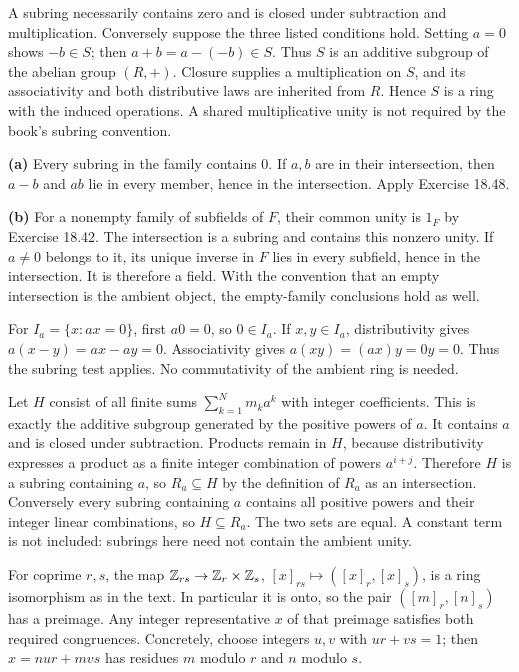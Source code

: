 A subring necessarily contains zero and is closed under subtraction and multiplication. Conversely suppose the three listed conditions hold. Setting $a=0$ shows $-b\in S$; then $a+b=a-(-b)\in S$. Thus $S$ is an additive subgroup of the abelian group $(R,+)$. Closure supplies a multiplication on $S$, and its associativity and both distributive laws are inherited from $R$. Hence $S$ is a ring with the induced operations. A shared multiplicative unity is not required by the book's subring convention.

\textbf{(a)} Every subring in the family contains $0$. If $a,b$ are in their intersection, then $a-b$ and $ab$ lie in every member, hence in the intersection. Apply Exercise 18.48.\par
\textbf{(b)} For a nonempty family of subfields of $F$, their common unity is $1_F$ by Exercise 18.42. The intersection is a subring and contains this nonzero unity. If $a\ne0$ belongs to it, its unique inverse in $F$ lies in every subfield, hence in the intersection. It is therefore a field. With the convention that an empty intersection is the ambient object, the empty-family conclusions hold as well.

For $I_a=\{x:ax=0\}$, first $a0=0$, so $0\in I_a$. If $x,y\in I_a$, distributivity gives $a(x-y)=ax-ay=0$. Associativity gives $a(xy)=(ax)y=0y=0$. Thus the subring test applies. No commutativity of the ambient ring is needed.

Let $H$ consist of all finite sums $\sum_{k=1}^N m_k a^k$ with integer coefficients. This is exactly the additive subgroup generated by the positive powers of $a$. It contains $a$ and is closed under subtraction. Products remain in $H$, because distributivity expresses a product as a finite integer combination of powers $a^{i+j}$. Therefore $H$ is a subring containing $a$, so $R_a\subseteq H$ by the definition of $R_a$ as an intersection. Conversely every subring containing $a$ contains all positive powers and their integer linear combinations, so $H\subseteq R_a$. The two sets are equal. A constant term is not included: subrings here need not contain the ambient unity.

For coprime $r,s$, the map $\mathbb{Z}_{rs}\to\mathbb{Z}_r\times\mathbb{Z}_s$, $[x]_{rs}\mapsto([x]_r,[x]_s)$, is a ring isomorphism as in the text. In particular it is onto, so the pair $([m]_r,[n]_s)$ has a preimage. Any integer representative $x$ of that preimage satisfies both required congruences. Concretely, choose integers $u,v$ with $ur+vs=1$; then $x=nur+mvs$ has residues $m$ modulo $r$ and $n$ modulo $s$.


